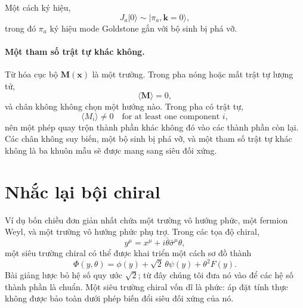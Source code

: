 \begin{classroomqa}
\end{classroomqa}

\begin{classroomqa}
\end{classroomqa}

Một cách ký hiệu,
\begin{equation}
J_a|0\rangle
\sim
|\pi_a,\mathbf k=0\rangle,
\label{eq:l9-generator-goldstone}
\end{equation}
trong đó \(\pi_a\) ký hiệu mode Goldstone gắn với bộ sinh bị phá vỡ.

\paragraph{Một tham số trật tự khác không.}
Từ hóa cục bộ \(\mathbf M(\mathbf x)\) là một trường. Trong pha nóng hoặc mất trật tự lượng tử,
\begin{equation}
\langle\mathbf M\rangle=0,
\end{equation}
và chân không không chọn một hướng nào. Trong pha có trật tự,
\begin{equation}
\langle M_i\rangle\neq0
\quad\text{for at least one component }i,
\label{eq:l9-magnetization-order}
\end{equation}
nên một phép quay trộn thành phần khác không đó vào các thành phần còn lại. Các chân không suy biến, một bộ sinh bị phá vỡ, và một tham số trật tự khác không là ba khuôn mẫu sẽ được mang sang siêu đối xứng.

\section{Nhắc lại bội chiral}

Ví dụ bốn chiều đơn giản nhất chứa một trường vô hướng phức, một fermion Weyl, và một trường vô hướng phức phụ trợ. Trong các tọa độ chiral,
\begin{equation}
y^\mu=x^\mu+i\bar\theta\bar\sigma^\mu\theta,
\end{equation}
một siêu trường chiral có thể được khai triển một cách sơ đồ thành
\begin{equation}
\Phi(y,\theta)=
\phi(y)+\sqrt2\,\theta\psi(y)+\theta^2F(y).
\label{eq:l9-chiral-expansion}
\end{equation}
Bài giảng lược bỏ hệ số quy ước \(\sqrt2\); từ đây chúng tôi đưa nó vào để các hệ số thành phần là chuẩn. Một siêu trường chiral vốn dĩ là phức: áp đặt tính thực không được bảo toàn dưới phép biến đổi siêu đối xứng của nó.

